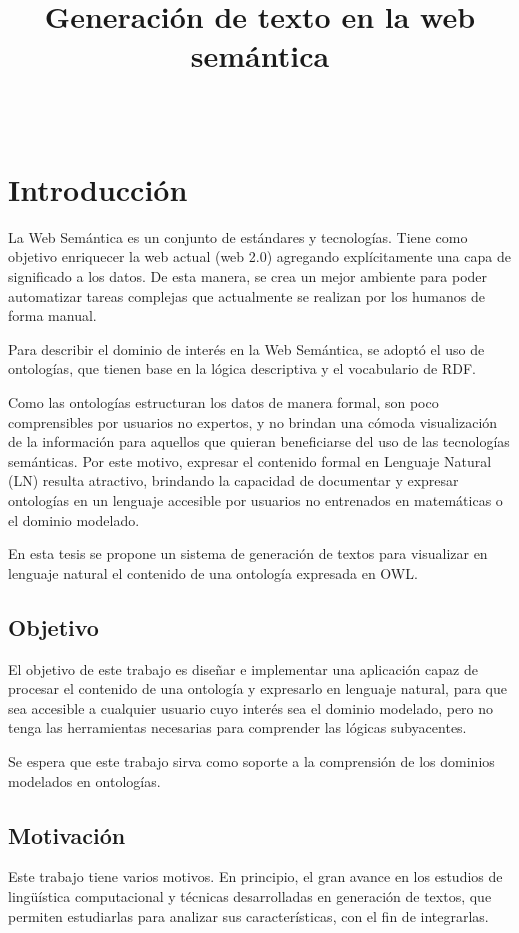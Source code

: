 \documentclass[11pt,a4paper,spanish]{book}
\begin{document}
	
\title{Generación de texto en la web semántica}
\author{\ }
\date{}
\maketitle

\frontmatter
\tableofcontents
\mainmatter

\chapter{Introducción}
La Web Semántica es un conjunto de estándares y tecnologías. Tiene como objetivo enriquecer la web actual (web 2.0) agregando explícitamente una capa de significado a los datos. De esta manera, se crea un mejor ambiente para poder automatizar tareas complejas que actualmente se realizan por los humanos de forma manual. 

Para describir el dominio de interés en la Web Semántica, se adoptó el uso de ontologías, que tienen base en la lógica descriptiva y el vocabulario de RDF.

Como las ontologías estructuran los datos de manera formal, son poco comprensibles por usuarios no expertos, y no brindan una cómoda visualización de la información para aquellos que quieran beneficiarse del uso de las tecnologías semánticas. Por este motivo, expresar el contenido formal en Lenguaje Natural (LN) resulta atractivo, brindando la capacidad de documentar y expresar ontologías en un lenguaje accesible por usuarios no entrenados en matemáticas o el dominio modelado. 

En esta tesis se propone un sistema de generación de textos para visualizar en lenguaje natural el contenido de una ontología expresada en OWL.

\section{Objetivo}
El objetivo de este trabajo es diseñar e implementar una aplicación capaz de procesar el contenido de una ontología y expresarlo en lenguaje natural, para que sea accesible a cualquier usuario cuyo interés sea el dominio modelado, pero no tenga las herramientas necesarias para comprender las lógicas subyacentes.

Se espera que este trabajo sirva como soporte a la comprensión de los dominios modelados en ontologías.

\section{Motivación}
Este trabajo tiene varios motivos.
En principio, el gran avance en los estudios de lingüística computacional y técnicas desarrolladas en generación de textos, que permiten estudiarlas para analizar sus características, con el fin de integrarlas.
\end{document}
